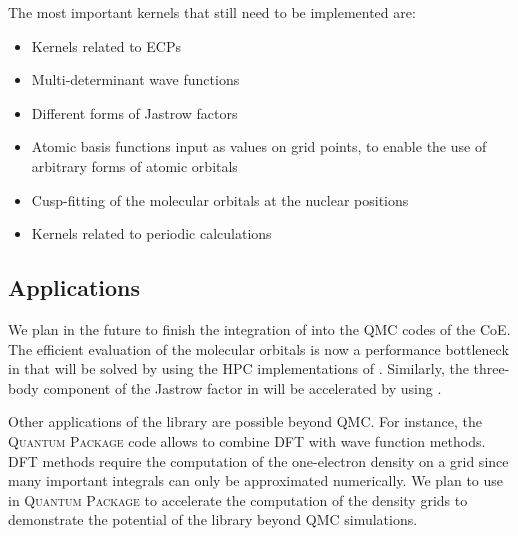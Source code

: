 The most important kernels that still need to be implemented are:
\begin{itemize}
  \item Kernels related to \acp{ECP}
  \item Multi-determinant wave functions
  \item Different forms of Jastrow factors
  \item Atomic basis functions input as values on grid points, to enable the use of
        arbitrary forms of atomic orbitals
  \item Cusp-fitting of the molecular orbitals at the nuclear positions
  \item Kernels related to periodic calculations
\end{itemize}

\subsection{Applications}

\newcommand{\qp}{\textsc{Quantum Package}}

We plan in the future to finish the integration of \QMCkl{} into the \ac{QMC}
codes of the \ac{CoE}. The efficient evaluation of the molecular orbitals is
now a performance bottleneck in \turbo{} that will be solved by using the
\ac{HPC} implementations of \QMCkl{}. Similarly, the three-body component of
the Jastrow factor in \champ{} will be accelerated by using \QMCkl{}.

Other applications of the library are possible beyond \ac{QMC}. For instance, 
the \qp{} code allows to combine \ac{DFT} with wave function
methods. \ac{DFT} methods require the computation of the one-electron density on 
a grid since many important integrals can only be approximated numerically. We
plan to use \QMCkl{} in \qp{} to accelerate the computation of the density grids
to demonstrate the potential of the library beyond \ac{QMC} simulations.


\clearpage


